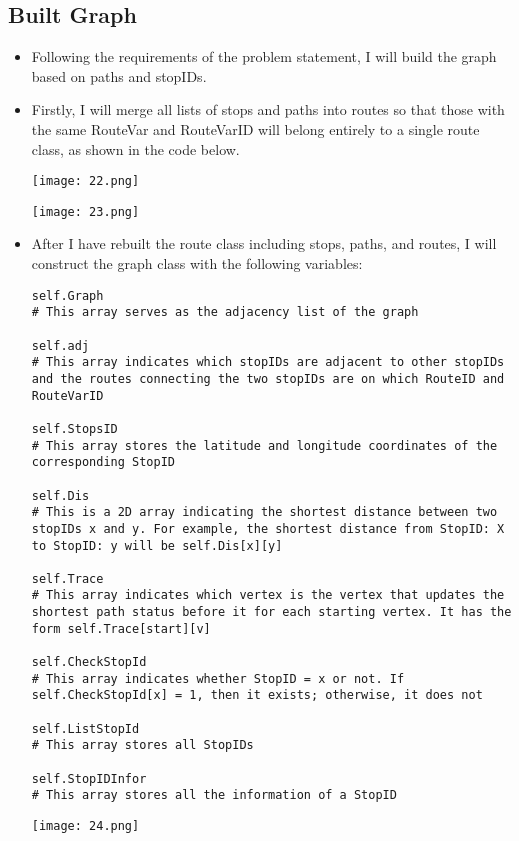 \documentclass[12pt]{scrartcl}
\begin{document}
\subsection{Built Graph}
\begin{itemize}
\item Following the requirements of the problem statement, I will build the graph based on paths and stopIDs.
\item Firstly, I will merge all lists of stops and paths into routes so that those with the same RouteVar and RouteVarID will belong entirely to a single route class, as shown in the code below.

        \begin{center}
            \texttt{[image: 22.png]}
        \end{center}

                \begin{center}
            \texttt{[image: 23.png]}
        \end{center}
\newpage
\item  After I have rebuilt the route class including stops, paths, and routes, I will construct the graph class with the following variables: 
    \begin{lstlisting}
self.Graph 
# This array serves as the adjacency list of the graph 

self.adj
# This array indicates which stopIDs are adjacent to other stopIDs and the routes connecting the two stopIDs are on which RouteID and RouteVarID 

self.StopsID
# This array stores the latitude and longitude coordinates of the corresponding StopID 

self.Dis
# This is a 2D array indicating the shortest distance between two stopIDs x and y. For example, the shortest distance from StopID: X to StopID: y will be self.Dis[x][y] 

self.Trace
# This array indicates which vertex is the vertex that updates the shortest path status before it for each starting vertex. It has the form self.Trace[start][v] 

self.CheckStopId
# This array indicates whether StopID = x or not. If self.CheckStopId[x] = 1, then it exists; otherwise, it does not 

self.ListStopId
# This array stores all StopIDs 

self.StopIDInfor
# This array stores all the information of a StopID

    \end{lstlisting}
        \begin{center}
            \texttt{[image: 24.png]}
        \end{center}
\newpage


\end{itemize}
\end{document}
